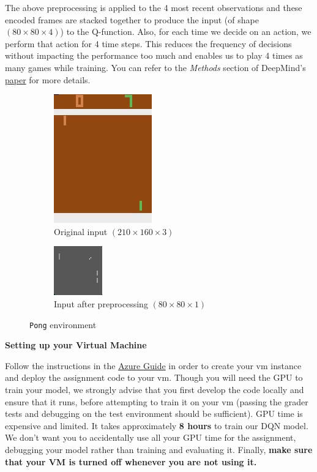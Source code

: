The above preprocessing is applied to the 4 most recent observations and these encoded frames are stacked together to produce the input (of shape $(80 \times 80 \times 4)$) to the Q-function. Also, for each time we decide on an action, we perform that action for 4 time steps. This reduces the frequency of decisions without impacting the performance too much and enables us to play 4 times as many games while training. You can refer to the \textit{Methods} section of DeepMind's \href{https://storage.googleapis.com/deepmind-media/dqn/DQNNaturePaper.pdf}{paper} for more details. \\

\begin{figure}[H]
\centering
\begin{subfigure}[b]{.4\textwidth}
  \centering
  \includegraphics[width=.25\linewidth]{images/pong}
  \caption{Original input $ (210 \times 160 \times 3)$ }
  \label{fig:pong}
\end{subfigure}
\begin{subfigure}[b]{.4\textwidth}
  \centering
  \includegraphics[width=.25\linewidth]{images/pong_grey}
  \caption{Input after preprocessing $ (80 \times 80 \times 1 ) $}
  \label{fig:pong_grey}
\end{subfigure}
\caption{\texttt{Pong} environment}
\label{fig:pong_env}
\end{figure}

\textbf{Setting up your Virtual Machine}

Follow the instructions in the \href{https://github.com/scpd-proed/XCS234-Handouts/blob/main/Azure/Azure%20Guide.pdf}{Azure Guide} in order to create your vm instance and deploy the assignment code to your vm. Though you will need the GPU to train your model, we strongly advise that you first develop the code locally and ensure that it runs, before attempting to train it on your vm (passing the grader tests and debugging on the test environment should be sufficient). GPU time is expensive and limited. It takes approximately \textbf{8 hours} to train our DQN model. We don't want you to accidentally use all your GPU time for the assignment, debugging your model rather than training and evaluating it. Finally, \textbf{make sure that your VM is turned off whenever you are not using it.}

